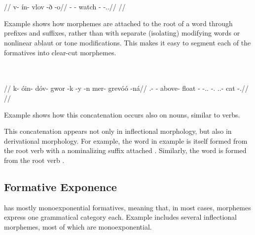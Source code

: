 	\begingl
		\glpreamble{}\\
		\\
		//
		\gla v- ín- vlov -ð -o//
		\glb \Pass- \Cond- watch -\Dur{} -\At.\Dir.\Fps//
		\glft {}//
	\endgl
\xe

Example  shows how morphemes are attached to the root of a word through prefixes and suffixes, rather than with separate (isolating) modifying words or nonlinear ablaut or tone modifications. This makes it easy to segment each of the formatives into clear-cut morphemes.

	\begingl
		\glpreamble{}\\
		\\
		//
		\gla k- óin- dóv- gwor -k -y -n mer- grevóó -ná//
		\glb \Act.\Neg- \Nec- above- float -\Term{} -\Pt.\Dir.\Sps{} -\Idr.\Tpp{} \Fps.\Poss.\Ali- cat -\Idr.\Pl//
		\glft {}//
	\endgl
\xe

Example  shows how this concatenation occurs also on nouns, similar to verbs.

This concatenation appears not only in inflectional morphology, but also in derivational morphology. For example, the word  in example  is itself formed from the root verb     with a nominalizing suffix attached . Similarly, the word     is formed from the root verb     .


\subsection{Formative Exponence}
\label{sec:exponence}

\lang{} has mostly monoexponential formatives, meaning that, in most cases, morphemes express one grammatical category each\autocite{wals-21}. Example  includes several inflectional morphemes, most of which are monoexponential.

